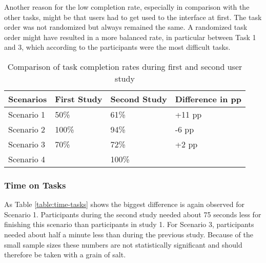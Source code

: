 Another reason for the low completion rate, especially in comparison with the other tasks, might be that users had to get used to the interface at first. The task order was not randomized but always remained the same. A randomized task order might have resulted in a more balanced rate, in particular between Task 1 and 3, which according to the participants were the most difficult tasks.

\begin{table}[h!]
\centering
\begin{tabular}{|l|l|l|l|}
\hline
\rowcolor[HTML]{EFEFEF}
{\bf Scenarios} & {\bf First Study} & {\bf Second Study} & {\bf Difference in pp} \\ \hline
Scenario 1 & 50\% & 61\% & +11 pp \\ \hline
Scenario 2 & 100\% & 94\% & -6 pp \\ \hline
Scenario 3 & 70\% & 72\% & +2 pp \\ \hline
Scenario 4 &  & 100\% &  \\ \hline
\end{tabular}
\caption{Comparison of task completion rates during first and second user study}
\label{table:task-compl}
\end{table}

\subsubsection{Time on Tasks}
As Table \ref{table:time-tasks} shows the biggest difference is again observed for Scenario 1. Participants during the second study needed about 75 seconds less for finishing this scenario than participants in study 1. For Scenario 3, participants needed about half a minute less than during the previous study. Because of the small sample sizes these numbers are not statistically significant and should therefore be taken with a grain of salt.

\begin{table}[h!]
\centering
{}
\caption{Time on tasks (in seconds)}
\label{table:time-tasks}
\end{table}

